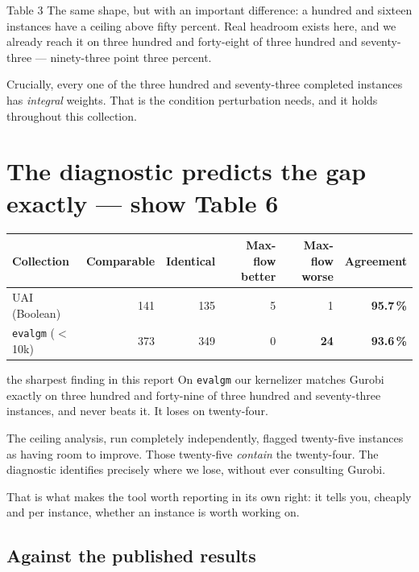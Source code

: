 \documentclass[11pt,a4paper]{article}
\newcommand{\good}[1]{\textcolor{okgreen}{\textbf{#1}}}
\begin{document}
\begin{say}{Table 3}
The same shape, but with an important difference: a hundred and sixteen instances have a ceiling
above fifty percent. Real headroom exists here, and we already reach it on three hundred and
forty-eight of three hundred and seventy-three --- ninety-three point three percent.

Crucially, every one of the three hundred and seventy-three completed instances has \emph{integral}
weights. That is the condition perturbation needs, and it holds throughout this collection.
\end{say}

\section{The diagnostic predicts the gap exactly --- show Table 6}

\begin{center}
\begin{tabular}{@{}lrrrrr@{}}
\toprule
Collection & Comparable & Identical & Max-flow better & Max-flow worse & Agreement \\
\midrule
UAI (Boolean) & 141 & 135 & 5 & 1 & \good{95.7\,\%} \\
\texttt{evalgm} ($<$10k) & 373 & 349 & 0 & \textbf{24} & \good{93.6\,\%} \\
\bottomrule
\end{tabular}
\end{center}

\begin{say}{the sharpest finding in this report}
On \texttt{evalgm} our kernelizer matches Gurobi exactly on three hundred and forty-nine of three
hundred and seventy-three instances, and never beats it. It loses on twenty-four.

The ceiling analysis, run completely independently, flagged twenty-five instances as having room to
improve. Those twenty-five \emph{contain} the twenty-four. The diagnostic identifies precisely where
we lose, without ever consulting Gurobi.

That is what makes the tool worth reporting in its own right: it tells you, cheaply and per
instance, whether an instance is worth working on.
\end{say}

\subsection{Against the published results}
\end{document}
